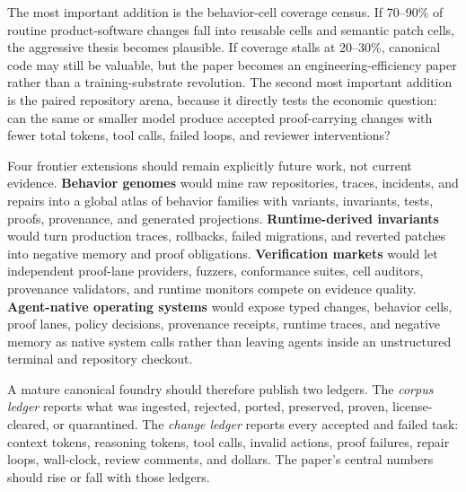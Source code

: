 The most important addition is the behavior-cell coverage census. If 70--90\% of routine product-software changes fall into reusable cells and semantic patch cells, the aggressive thesis becomes plausible. If coverage stalls at 20--30\%, canonical code may still be valuable, but the paper becomes an engineering-efficiency paper rather than a training-substrate revolution. The second most important addition is the paired repository arena, because it directly tests the economic question: can the same or smaller model produce accepted proof-carrying changes with fewer total tokens, tool calls, failed loops, and reviewer interventions?

Four frontier extensions should remain explicitly future work, not current evidence. \textbf{Behavior genomes} would mine raw repositories, traces, incidents, and repairs into a global atlas of behavior families with variants, invariants, tests, proofs, provenance, and generated projections. \textbf{Runtime-derived invariants} would turn production traces, rollbacks, failed migrations, and reverted patches into negative memory and proof obligations. \textbf{Verification markets} would let independent proof-lane providers, fuzzers, conformance suites, cell auditors, provenance validators, and runtime monitors compete on evidence quality. \textbf{Agent-native operating systems} would expose typed changes, behavior cells, proof lanes, policy decisions, provenance receipts, runtime traces, and negative memory as native system calls rather than leaving agents inside an unstructured terminal and repository checkout.

A mature canonical foundry should therefore publish two ledgers. The \emph{corpus ledger} reports what was ingested, rejected, ported, preserved, proven, license-cleared, or quarantined. The \emph{change ledger} reports every accepted and failed task: context tokens, reasoning tokens, tool calls, invalid actions, proof failures, repair loops, wall-clock, review comments, and dollars. The paper's central numbers should rise or fall with those ledgers.

